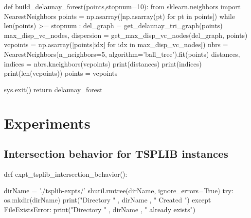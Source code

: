 \nwenddocs{}\plusendmoddef\nwstartdeflinemarkup{}\nwenddeflinemarkup
def build_delaunay_forest(points,stopnum=10):
     from sklearn.neighbors import NearestNeighbors     
     points = np.asarray([np.asarray(pt) for pt in points])
     while len(points) >= stopnum :
              del_graph                     = get_delaunay_tri_graph(points)
              max_disp_vc_nodes, dispersion = get_max_disp_vc_nodes(del_graph, points) 
              vcpoints                      = np.asarray([points[idx] for idx in max_disp_vc_nodes])
              nbrs                          = NearestNeighbors(n_neighbors=5, algorithm='ball_tree').fit(points)
              distances, indices            = nbrs.kneighbors(vcpoints)
              print(distances)
              print(indices)
              print(len(vcpoints))
              points             = vcpoints

     sys.exit()
     return delaunay_forest
\nwendcode{}\nwdocspar







\section{Experiments}

\subsection{Intersection behavior for TSPLIB instances}
\nwenddocs{}\endmoddef\nwstartdeflinemarkup{}\nwenddeflinemarkup
def expt_tsplib_intersection_behavior():
 
     dirName = './tsplib-expts/'
     shutil.rmtree(dirName, ignore_errors=True)
     try:
         os.mkdir(dirName)
         print("Directory " , dirName ,  " Created ") 
     except FileExistsError:
         print("Directory " , dirName ,  " already exists")
    
